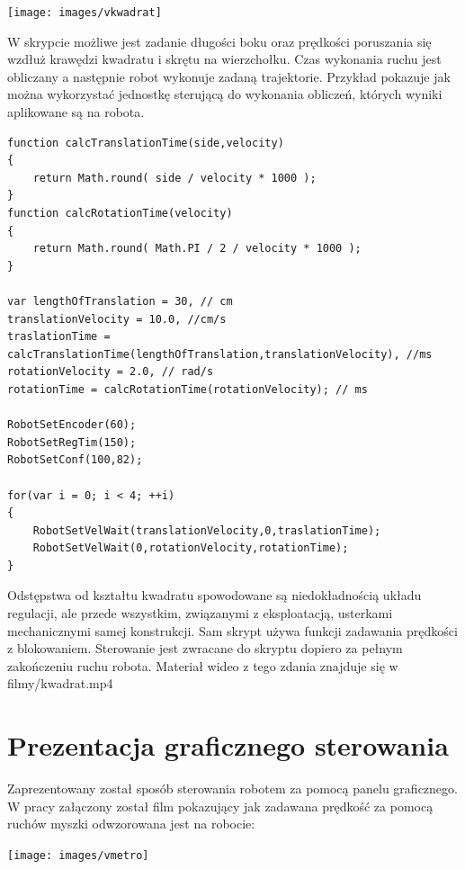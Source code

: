 \documentclass[eng,printmode]{mgr}
\begin{document}
\begin{center}
  \texttt{[image: images/vkwadrat]}
\end{center}

W skrypcie możliwe jest zadanie długości boku oraz prędkości poruszania się wzdłuż krawędzi kwadratu i skrętu na wierzchołku. Czas wykonania ruchu jest obliczany a następnie robot wykonuje zadaną trajektorie. 
Przykład pokazuje jak można wykorzystać jednostkę sterującą do wykonania obliczeń, których wyniki aplikowane są na robota. 

\begin{lstlisting}[style=c]
function calcTranslationTime(side,velocity)
{
	return Math.round( side / velocity * 1000 );
}
function calcRotationTime(velocity)
{
	return Math.round( Math.PI / 2 / velocity * 1000 ); 
}

var lengthOfTranslation = 30, // cm
translationVelocity = 10.0, //cm/s
traslationTime = calcTranslationTime(lengthOfTranslation,translationVelocity), //ms
rotationVelocity = 2.0, // rad/s
rotationTime = calcRotationTime(rotationVelocity); // ms

RobotSetEncoder(60);
RobotSetRegTim(150);
RobotSetConf(100,82);

for(var i = 0; i < 4; ++i)
{
	RobotSetVelWait(translationVelocity,0,traslationTime);
	RobotSetVelWait(0,rotationVelocity,rotationTime);
}
\end{lstlisting}

Odstępstwa od kształtu kwadratu spowodowane są niedokładnością układu regulacji, ale przede wszystkim, związanymi z eksploatacją, usterkami mechanicznymi samej konstrukcji. Sam skrypt używa funkcji zadawania prędkości z blokowaniem. Sterowanie jest zwracane do skryptu dopiero za pełnym zakończeniu ruchu robota. Materiał wideo z tego zdania znajduje się w filmy/kwadrat.mp4

 \section{Prezentacja graficznego sterowania}
Zaprezentowany został sposób sterowania robotem za pomocą panelu graficznego. W pracy załączony został film pokazujący jak zadawana prędkość za pomocą ruchów myszki odwzorowana jest na robocie:

\begin{center}
  \texttt{[image: images/vmetro]}
\end{center}
\end{document}
